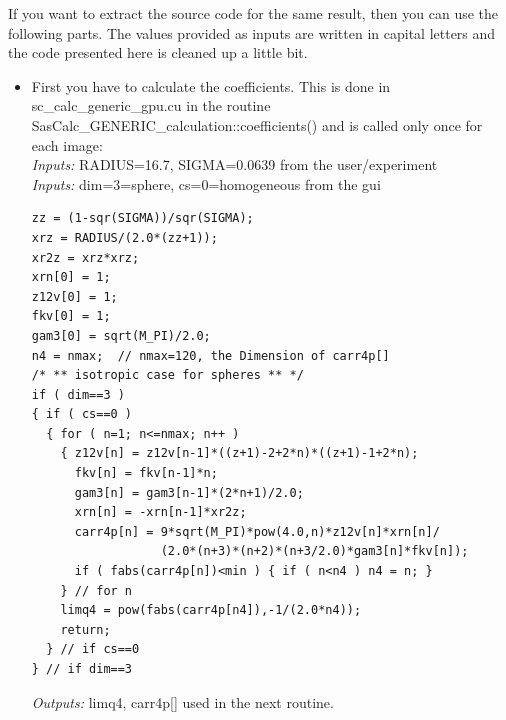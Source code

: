 \documentclass[11pt]{article} %
\begin{document}
\clearpage
If you want to extract the source code for the same result, then you can use the following parts. The values provided as inputs are written in capital letters and the code presented here is cleaned up a little bit.
\begin{itemize}
\item First you have to calculate the coefficients. This is done in sc\_calc\_generic\_gpu.cu in the routine SasCalc\_GENERIC\_calculation::coefficients() and is called only once for each image: \\
{\it Inputs:} RADIUS{\small =16.7}, SIGMA{\small =0.0639} from the user/experiment \\
{\it Inputs:} dim=3=sphere, cs=0=homogeneous from the gui
\begin{lstlisting}[frame=single]
zz = (1-sqr(SIGMA))/sqr(SIGMA); 
xrz = RADIUS/(2.0*(zz+1));
xr2z = xrz*xrz;
xrn[0] = 1;
z12v[0] = 1;
fkv[0] = 1;
gam3[0] = sqrt(M_PI)/2.0;
n4 = nmax;  // nmax=120, the Dimension of carr4p[]
/* ** isotropic case for spheres ** */
if ( dim==3 )
{ if ( cs==0 )
  { for ( n=1; n<=nmax; n++ )
    { z12v[n] = z12v[n-1]*((z+1)-2+2*n)*((z+1)-1+2*n);
      fkv[n] = fkv[n-1]*n;
      gam3[n] = gam3[n-1]*(2*n+1)/2.0;
      xrn[n] = -xrn[n-1]*xr2z;
      carr4p[n] = 9*sqrt(M_PI)*pow(4.0,n)*z12v[n]*xrn[n]/
                  (2.0*(n+3)*(n+2)*(n+3/2.0)*gam3[n]*fkv[n]);
      if ( fabs(carr4p[n])<min ) { if ( n<n4 ) n4 = n; }
    } // for n
    limq4 = pow(fabs(carr4p[n4]),-1/(2.0*n4));
    return;
  } // if cs==0
} // if dim==3
\end{lstlisting}
{\it Outputs:} limq4, carr4p[] used in the next routine.


\end{itemize}
\end{document}
